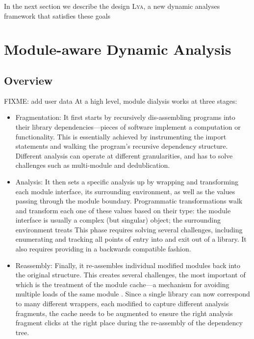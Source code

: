 \documentclass[letterpaper,twocolumn,10pt]{article}
\newcommand{\sys}{{\scshape Lya}\xspace}
\newcommand{\Fra}{Fragmentation\xspace} %
\newcommand{\Ana}{Analysis\xspace}      %
\newcommand{\Ass}{Reassembly\xspace}    %
\begin{document}
In the next section we describe the design \sys, a new dynamic analyses
framework that satisfies these goals

\section{Module-aware Dynamic Analysis}
\label{design}

\subsection{Overview}

FIXME: add user data
At a high level, module dialysis works at three stages:

\begin{itemize}
  
  \item \Fra:
    It first starts by recursively dis-assembling programs into their library dependencies---pieces of software implement a computation or functionality.
    This is essentially achieved by instrumenting the import statements and walking the program's recursive dependency structure.
    Different analysis can operate at different granularities, and has to solve challenges such as multi-module and dedublication.

  \item \Ana:
It then sets a specific analysis up by wrapping and transforming each module interface, its surrounding environment, as well as the values passing through the module boundary.
Programmatic transformations walk and transform each one of these values based on their type:
  the module interface is usually a complex (but singular) object; the surrounding environment treats 
This phase requires solving several challenges, including enumerating and tracking all points of entry into and exit out of a library.
It also requires providing 
 in a backwards compatible fashion.

  \item \Ass:
  Finally, it re-assembles individual modified modules back into the original structure.
  This creates several challenges, the most important of which is the treatment of the module cache---a mechanism for avoiding multiple loads of the same module .
  Since a single library can now correspond to many different wrappers, each modified to capture different  analysis fragments, the cache needs to be augmented to ensure the right analysis fragment clicks at the right place during the re-assembly of the dependency tree.

\end{itemize}
\end{document}
